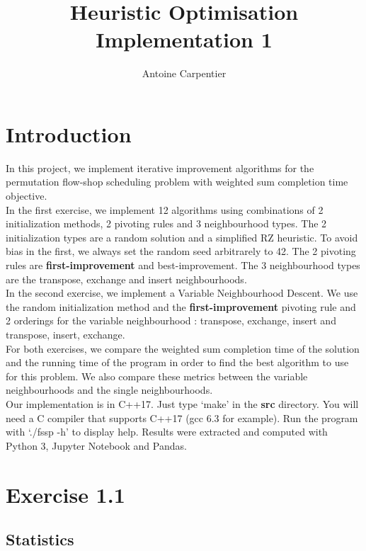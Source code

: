 \documentclass[a4paper,10pt]{article}
\title{Heuristic Optimisation\\Implementation 1}
\author{Antoine Carpentier}
\begin{document}
\maketitle

\section{Introduction}

In this project, we implement iterative improvement algorithms for the permutation flow-shop scheduling problem with weighted sum completion time objective. \\

In the first exercise, we implement 12 algorithms using combinations of 2 initialization methods, 2 pivoting rules and 3 neighbourhood types. The 2 initialization types are a random solution and a simplified RZ heuristic. To avoid bias in the first, we always set the random seed arbitrarely to 42. The 2 pivoting rules are \textbf{first-improvement} and best-improvement. The 3 neighbourhood types are the transpose, exchange and insert neighbourhoods. \\

In the second exercise, we implement a Variable Neighbourhood Descent. We use the random initialization method and the \textbf{first-improvement} pivoting rule and 2 orderings for the variable neighbourhood : transpose, exchange, insert and transpose, insert, exchange. \\

For both exercises, we compare the weighted sum completion time of the solution and the running time of the program in order to find the best algorithm to use for this problem. We also compare these metrics between the variable neighbourhoods and the single neighbourhoods. \\

Our implementation is in C++17. Just type `make' in the \textbf{src} directory. You will need a C compiler that supports C++17 (gcc 6.3 for example). Run the program with `./fssp -h' to display help. Results were extracted and computed with Python 3, Jupyter Notebook and Pandas.

\section{Exercise 1.1}

\subsection{Statistics}
\end{document}
